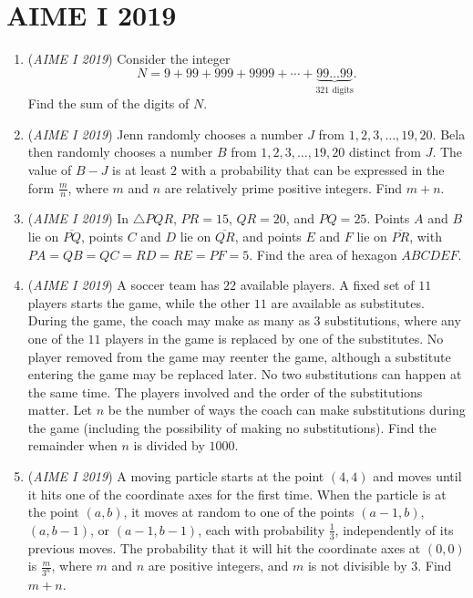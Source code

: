 \section{AIME I 2019}
        \begin{enumerate}
        	\item (\textit{AIME I 2019}) Consider the integer 
 \[N = 9 + 99 + 999 + 9999 + \cdots + \underbrace{99\ldots 99}_\text{321 digits}.\]Find the sum of the digits of $N$.


 

	\item (\textit{AIME I 2019}) Jenn randomly chooses a number $J$ from $1, 2, 3,\ldots, 19, 20$. Bela then randomly chooses a number $B$ from $1, 2, 3,\ldots, 19, 20$ distinct from $J$. The value of $B - J$ is at least $2$ with a probability that can be expressed in the form $\frac{m}{n}$, where $m$ and $n$ are relatively prime positive integers. Find $m+n$.


 

	\item (\textit{AIME I 2019}) In $\triangle PQR$, $PR=15$, $QR=20$, and $PQ=25$. Points $A$ and $B$ lie on $\overline{PQ}$, points $C$ and $D$ lie on $\overline{QR}$, and points $E$ and $F$ lie on $\overline{PR}$, with $PA=QB=QC=RD=RE=PF=5$. Find the area of hexagon $ABCDEF$.


 

	\item (\textit{AIME I 2019}) A soccer team has $22$ available players. A fixed set of $11$ players starts the game, while the other $11$ are available as substitutes. During the game, the coach may make as many as $3$ substitutions, where any one of the $11$ players in the game is replaced by one of the substitutes. No player removed from the game may reenter the game, although a substitute entering the game may be replaced later. No two substitutions can happen at the same time. The players involved and the order of the substitutions matter. Let $n$ be the number of ways the coach can make substitutions during the game (including the possibility of making no substitutions). Find the remainder when $n$ is divided by $1000$.


 

	\item (\textit{AIME I 2019}) A moving particle starts at the point $(4,4)$ and moves until it hits one of the coordinate axes for the first time. When the particle is at the point $(a,b)$, it moves at random to one of the points $(a-1,b)$, $(a,b-1)$, or $(a-1,b-1)$, each with probability $\frac{1}{3}$, independently of its previous moves. The probability that it will hit the coordinate axes at $(0,0)$ is $\frac{m}{3^n}$, where $m$ and $n$ are positive integers, and $m$ is not divisible by $3$. Find $m + n$.



\end{enumerate}
